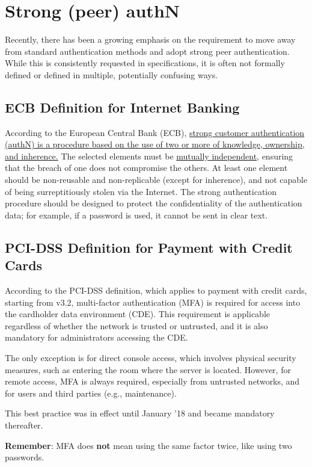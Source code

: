 \section{Strong (peer) authN}
Recently, there has been a growing emphasis on the requirement to move away from standard authentication methods and adopt strong peer authentication. While this is consistently requested in specifications, it is often not formally defined or defined in multiple, potentially confusing ways.



\subsection{ECB Definition for Internet Banking}
According to the European Central Bank (ECB), \ul{strong customer authentication (authN) is a procedure based on the use of two or more of knowledge, ownership, and inherence.} The selected elements must be \ul{mutually independent}, ensuring that the breach of one does not compromise the others. At least one element should be non-reusable and non-replicable (except for inherence), and not capable of being surreptitiously stolen via the Internet. The strong authentication procedure should be designed to protect the confidentiality of the authentication data; for example, if a password is used, it cannot be sent in clear text.


\subsection{PCI-DSS Definition for Payment with Credit Cards}
According to the PCI-DSS definition, which applies to payment with credit cards, starting from v3.2, multi-factor authentication (MFA) is required for access into the cardholder data environment (CDE). This requirement is applicable regardless of whether the network is trusted or untrusted, and it is also mandatory for administrators accessing the CDE.

The only exception is for direct console access, which involves physical security measures, such as entering the room where the server is located. However, for remote access, MFA is always required, especially from untrusted networks, and for users and third parties (e.g., maintenance).

This best practice was in effect until January '18 and became mandatory thereafter.

\textbf{Remember}: MFA does \textbf{not} mean using the same factor twice, like using two passwords.



